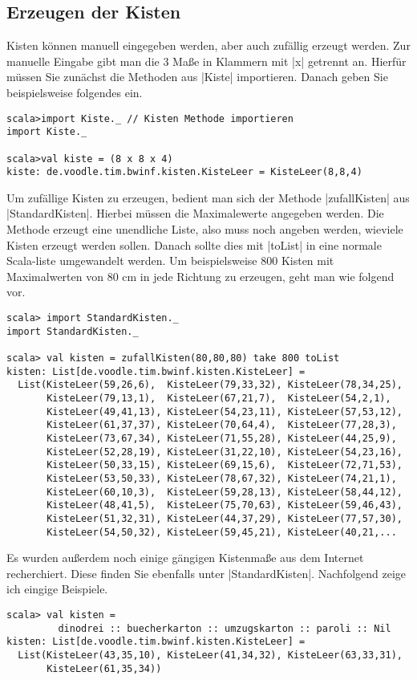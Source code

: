 \subsection{Erzeugen der Kisten}
Kisten können manuell eingegeben werden, aber auch zufällig erzeugt werden.
Zur manuelle Eingabe gibt man die 3 Maße in Klammern mit |x| getrennt an.
Hierfür müssen Sie zunächst die Methoden aus |Kiste| importieren. Danach geben Sie beispielsweise folgendes ein.
\begin{lstlisting}
scala>import Kiste._ // Kisten Methode importieren
import Kiste._

scala>val kiste = (8 x 8 x 4)
kiste: de.voodle.tim.bwinf.kisten.KisteLeer = KisteLeer(8,8,4)

\end{lstlisting}
Um zufällige Kisten zu erzeugen, bedient man sich der Methode |zufallKisten| aus |StandardKisten|.
Hierbei müssen die Maximalewerte angegeben werden.
Die Methode erzeugt eine unendliche Liste, also muss noch angeben werden, wieviele Kisten erzeugt werden sollen.
Danach sollte dies mit |toList| in eine normale Scala-liste umgewandelt werden.
Um beispielsweise 800 Kisten mit Maximalwerten von 80 cm in jede Richtung zu erzeugen, geht man wie folgend vor.
\begin{lstlisting}
scala> import StandardKisten._
import StandardKisten._

scala> val kisten = zufallKisten(80,80,80) take 800 toList
kisten: List[de.voodle.tim.bwinf.kisten.KisteLeer] =
  List(KisteLeer(59,26,6),  KisteLeer(79,33,32), KisteLeer(78,34,25),
       KisteLeer(79,13,1),  KisteLeer(67,21,7),  KisteLeer(54,2,1),
       KisteLeer(49,41,13), KisteLeer(54,23,11), KisteLeer(57,53,12),
       KisteLeer(61,37,37), KisteLeer(70,64,4),  KisteLeer(77,28,3),
       KisteLeer(73,67,34), KisteLeer(71,55,28), KisteLeer(44,25,9),
       KisteLeer(52,28,19), KisteLeer(31,22,10), KisteLeer(54,23,16),
       KisteLeer(50,33,15), KisteLeer(69,15,6),  KisteLeer(72,71,53),
       KisteLeer(53,50,33), KisteLeer(78,67,32), KisteLeer(74,21,1),
       KisteLeer(60,10,3),  KisteLeer(59,28,13), KisteLeer(58,44,12),
       KisteLeer(48,41,5),  KisteLeer(75,70,63), KisteLeer(59,46,43),
       KisteLeer(51,32,31), KisteLeer(44,37,29), KisteLeer(77,57,30),
       KisteLeer(54,50,32), KisteLeer(59,45,21), KisteLeer(40,21,...
\end{lstlisting}
Es wurden außerdem noch einige gängigen Kistenmaße aus dem Internet recherchiert.
Diese finden Sie ebenfalls unter |StandardKisten|.
Nachfolgend zeige ich eingige Beispiele.
\begin{lstlisting}
scala> val kisten =
         dinodrei :: buecherkarton :: umzugskarton :: paroli :: Nil
kisten: List[de.voodle.tim.bwinf.kisten.KisteLeer] =
  List(KisteLeer(43,35,10), KisteLeer(41,34,32), KisteLeer(63,33,31),
       KisteLeer(61,35,34))

\end{lstlisting}
